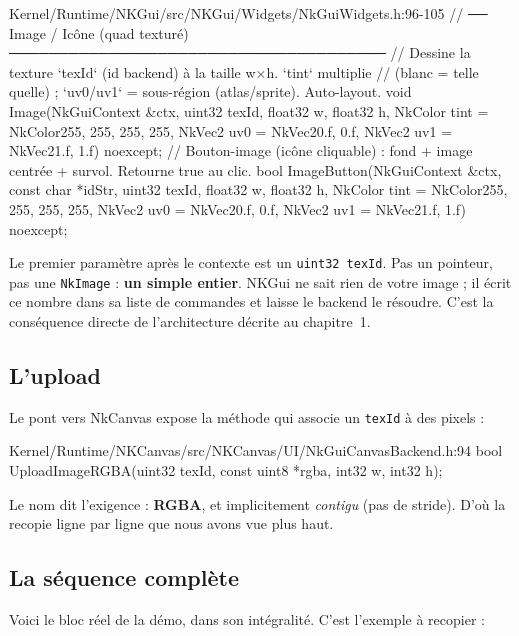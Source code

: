 \begin{nkcode}{Kernel/Runtime/NKGui/src/NKGui/Widgets/NkGuiWidgets.h:96-105}
        // ── Image / Icône (quad texturé) ──────────────────────────────────────
        // Dessine la texture `texId` (id backend) à la taille w×h. `tint` multiplie
        // (blanc = telle quelle) ; `uv0/uv1` = sous-région (atlas/sprite). Auto-layout.
        void Image(NkGuiContext &ctx, uint32 texId, float32 w, float32 h,
                   NkColor tint = NkColor{255, 255, 255, 255}, NkVec2 uv0 = NkVec2{0.f, 0.f},
                   NkVec2 uv1 = NkVec2{1.f, 1.f}) noexcept;
        // Bouton-image (icône cliquable) : fond + image centrée + survol. Retourne true au clic.
        bool ImageButton(NkGuiContext &ctx, const char *idStr, uint32 texId, float32 w, float32 h,
                         NkColor tint = NkColor{255, 255, 255, 255}, NkVec2 uv0 = NkVec2{0.f, 0.f},
                         NkVec2 uv1 = NkVec2{1.f, 1.f}) noexcept;
\end{nkcode}

Le premier paramètre après le contexte est un \texttt{uint32 texId}. Pas un
pointeur, pas une \texttt{NkImage} : \textbf{un simple entier}. NKGui ne sait
rien de votre image ; il écrit ce nombre dans sa liste de commandes et laisse le
backend le résoudre. C'est la conséquence directe de l'architecture décrite au
chapitre~1.

\subsection{L'upload}

Le pont vers NkCanvas expose la méthode qui associe un \texttt{texId} à des
pixels :

\begin{nkcode}{Kernel/Runtime/NKCanvas/src/NKCanvas/UI/NkGuiCanvasBackend.h:94}
bool UploadImageRGBA(uint32 texId, const uint8 *rgba, int32 w, int32 h);
\end{nkcode}

Le nom dit l'exigence : \textbf{RGBA}, et implicitement \emph{contigu} (pas de
stride). D'où la recopie ligne par ligne que nous avons vue plus haut.

\subsection{La séquence complète}

Voici le bloc réel de la démo, dans son intégralité. C'est l'exemple à recopier :

